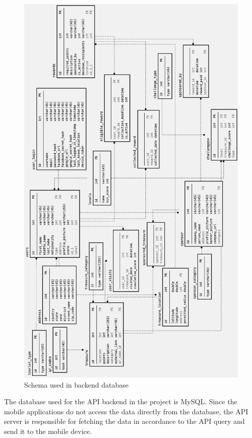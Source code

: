\documentclass[12pt, a4paper, oneside]{article}
\begin{document}
\begin{figure}[H]
\includegraphics[height=0.8\paperheight, keepaspectratio]{db/schema.png}
\centering
\caption{Schema used in backend database}
\label{fig:db-schema}
\end{figure}

The database used for the API backend in the project is MySQL. Since the mobile applications do not access the data directly from the database, the API server is responsible for fetching the data in accordance to the API query and send it to the mobile device. 
\end{document}
